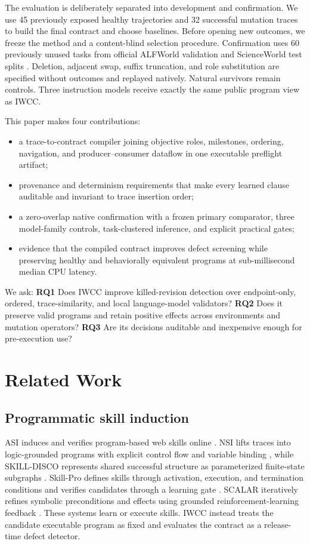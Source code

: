 \documentclass[pdflatex,sn-basic]{sn-jnl}
\newcommand{\TaskCount}{60}
\begin{document}
The evaluation is deliberately separated into development and confirmation. We use 45 previously exposed healthy trajectories and 32 successful mutation traces to build the final contract and choose baselines. Before opening new outcomes, we freeze the method and a content-blind selection procedure. Confirmation uses \TaskCount{} previously unused tasks from official ALFWorld validation and ScienceWorld test splits \citep{shridhar2021alfworld,wang2022scienceworld}. Deletion, adjacent swap, suffix truncation, and role substitution are specified without outcomes and replayed natively. Natural survivors remain controls. Three instruction models receive exactly the same public program view as IWCC.

This paper makes four contributions:
\begin{itemize}
  \item a trace-to-contract compiler joining objective roles, milestones, ordering, navigation, and producer--consumer dataflow in one executable preflight artifact;
  \item provenance and determinism requirements that make every learned clause auditable and invariant to trace insertion order;
  \item a zero-overlap native confirmation with a frozen primary comparator, three model-family controls, task-clustered inference, and explicit practical gates;
  \item evidence that the compiled contract improves defect screening while preserving healthy and behaviorally equivalent programs at sub-millisecond median CPU latency.
\end{itemize}

We ask: \textbf{RQ1} Does IWCC improve killed-revision detection over endpoint-only, ordered, trace-similarity, and local language-model validators? \textbf{RQ2} Does it preserve valid programs and retain positive effects across environments and mutation operators? \textbf{RQ3} Are its decisions auditable and inexpensive enough for pre-execution use?

\section{Related Work}
\subsection{Programmatic skill induction}
ASI induces and verifies program-based web skills online \citep{wang2025asi}. NSI lifts traces into logic-grounded programs with explicit control flow and variable binding \citep{shao2026nsi}, while SKILL-DISCO represents shared successful structure as parameterized finite-state subgraphs \citep{guo2026skilldisco}. Skill-Pro defines skills through activation, execution, and termination conditions and verifies candidates through a learning gate \citep{mi2026skillpro}. SCALAR iteratively refines symbolic preconditions and effects using grounded reinforcement-learning feedback \citep{zabounidis2026scalar}. These systems learn or execute skills. IWCC instead treats the candidate executable program as fixed and evaluates the contract as a release-time defect detector.
\end{document}
